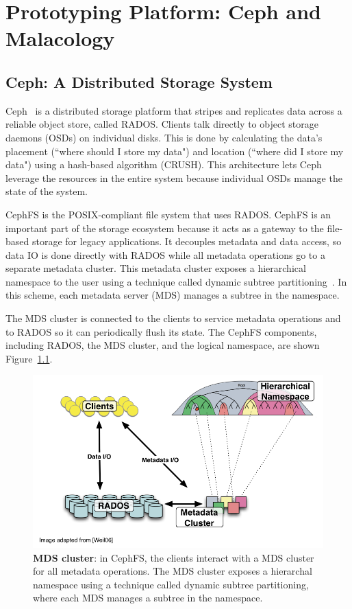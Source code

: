 \chapter{Prototyping Platform: Ceph and Malacology}


\section{Ceph: A Distributed Storage System }
Ceph~\cite{weil:osdi2006-ceph} is a distributed storage platform that stripes
and replicates data across a reliable object store, called RADOS. Clients talk
directly to object storage daemons (OSDs) on individual disks. This is done by
calculating the data's placement (``where should I store my data") and location
(``where did I store my data") using a hash-based algorithm (CRUSH). This
architecture lets Ceph leverage the resources in the entire system because
individual OSDs manage the state of the system. 

CephFS is the POSIX-compliant file system that uses RADOS. CephFS is an
important part of the storage ecosystem because it acts as a gateway to the
file-based storage for legacy applications. It decouples metadata and data
access, so data IO is done directly with RADOS while all metadata operations go
to a separate metadata cluster. This metadata cluster exposes a hierarchical
namespace to the user using a technique called dynamic subtree
partitioning~\cite{weil:sc2004-dyn-metadata}. In this scheme, each metadata
server (MDS) manages a subtree in the namespace. 

The MDS cluster is connected to the clients to service metadata operations and
to RADOS so it can periodically flush its state. The CephFS components,
including RADOS, the MDS cluster, and the logical namespace, are shown
Figure~\ref{ceph-arch}. 

\begin{figure}[tbh]
\centering
	\includegraphics[width=1\textwidth]{./chapters/advancement/figures/ceph-arch.png} 

	\caption{\textbf{MDS cluster}: in CephFS, the clients interact with a
        MDS cluster for all metadata operations. The MDS cluster exposes a hierarchal
        namespace using a technique called dynamic subtree partitioning, where each MDS
        manages a subtree in the namespace.\label{ceph-arch}}

\end{figure}

